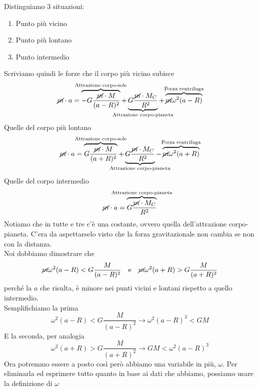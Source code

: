 Distinguiamo 3 situazioni:
\begin{enumerate}
  \item Punto più vicino
  \item Punto più lontano
  \item Punto intermedio
\end{enumerate}
Scriviamo quindi le forze che il corpo più vicino subisce
\begin{equation*}
  \cancel{m}\cdot a = 
  \overbrace{-G\frac{\cancel{m}\cdot M}{(a-R)^2}}^{\mathclap{\text{Attrazione corpo-sole}}}+
  \underbrace{G\frac{\cancel{m}\cdot M_C}{R^2}}_{\mathclap{\text{Attrazione corpo-pianeta}}}+
  \overbrace{\cancel{m}\omega^2(a-R)}^{\mathclap{\text{Forza centrifuga}}}
\end{equation*}
Quelle del corpo più lontano
\begin{equation*}
  \cancel{m}\cdot a = 
  \overbrace{G\frac{\cancel{m}\cdot M}{(a+R)^2}}^{\mathclap{\text{Attrazione corpo-sole}}}+
  \underbrace{G\frac{\cancel{m}\cdot M_C}{R^2}}_{\mathclap{\text{Attrazione corpo-pianeta}}}-
  \overbrace{\cancel{m}\omega^2(a+R)}^{\mathclap{\text{Forza centrifuga}}}
\end{equation*}
Quelle del corpo intermedio
\begin{equation*}
  \cancel{m}\cdot a =
  \overbrace{G\frac{\cancel{m}\cdot M_C}{R^2}}^{\mathclap{\text{Attrazione corpo-pianeta}}}
\end{equation*}
Notiamo che in tutte e tre c'è una costante, ovvero quella dell'attrazione corpo-pianeta. C'era da
aspettarselo visto che la forza gravitazionale non cambia se non con la distanza.\\
Noi dobbiamo dimostrare che
\begin{equation*}
  \cancel{m}\omega^2(a-R)<G\frac{M}{(a-R)^2}\quad\text{e}\quad\cancel{m}\omega^2(a+R)>G\frac{M}{(a+R)^2}
\end{equation*}
perché la $a$ che risulta, è minore nei punti vicini e lontani rispetto a quello intermedio.\\
Semplifichiamo la prima
\begin{equation*}
  \omega^2(a-R)<G\frac{M}{(a-R)^2} \rightarrow \omega^2(a-R)^3<GM
\end{equation*}
E la seconda, per analogia
\begin{equation*}
  \omega^2(a+R)>G\frac{M}{(a+R)^2} \rightarrow GM<\omega^2(a-R)^3
\end{equation*}
Ora potremmo essere a posto così però abbiamo una variabile in più, $\omega$. Per eliminarla ed
esprimere tutto quanto in base ai dati che abbiamo, possiamo usare la definizione di $\omega$
